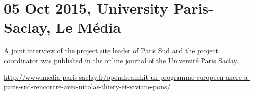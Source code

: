 \documentclass{deliverablereport}
\begin{document}
\clearpage

\clearpage

\section{05 Oct 2015, University Paris-Saclay, Le Média}

A \href{http://www.media-paris-saclay.fr/opendreamkit-un-programme-europeen-ancre-a-paris-sud-rencontre-avec-nicolas-thiery-et-viviane-pons/}{joint interview} of the project site leader of Paris Sud and the
project coordinator was published in the \href{http://www.media-paris-saclay.fr/}{online journal} of the
\href{https://www.universite-paris-saclay.fr/en}{Université Paris Saclay}.

{\tiny \url{http://www.media-paris-saclay.fr/opendreamkit-un-programme-europeen-ancre-a-paris-sud-rencontre-avec-nicolas-thiery-et-viviane-pons/}}
\end{document}
